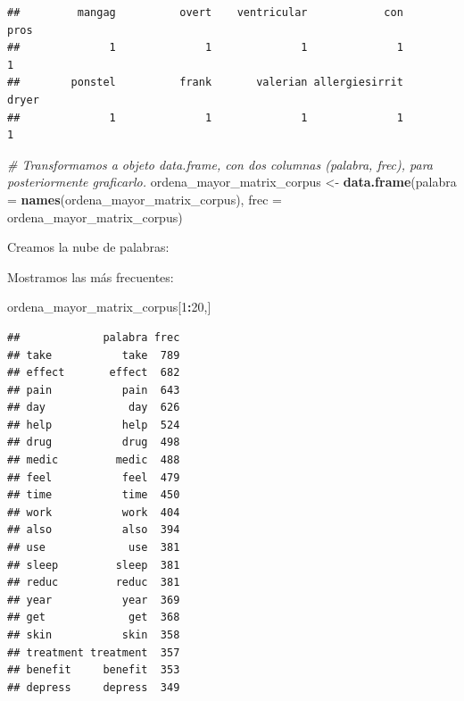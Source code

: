 \documentclass[spanish,]{article}
\newenvironment{Shaded}{\begin{snugshade}}{\end{snugshade}}
\newcommand{\KeywordTok}[1]{\textcolor[rgb]{0.13,0.29,0.53}{\textbf{#1}}}
\newcommand{\DataTypeTok}[1]{\textcolor[rgb]{0.13,0.29,0.53}{#1}}
\newcommand{\DecValTok}[1]{\textcolor[rgb]{0.00,0.00,0.81}{#1}}
\newcommand{\StringTok}[1]{\textcolor[rgb]{0.31,0.60,0.02}{#1}}
\newcommand{\CommentTok}[1]{\textcolor[rgb]{0.56,0.35,0.01}{\textit{#1}}}
\newcommand{\OperatorTok}[1]{\textcolor[rgb]{0.81,0.36,0.00}{\textbf{#1}}}
\newcommand{\NormalTok}[1]{#1}
\begin{document}
\begin{verbatim}
##         mangag          overt    ventricular            con           pros 
##              1              1              1              1              1 
##        ponstel          frank       valerian allergiesirrit          dryer 
##              1              1              1              1              1
\end{verbatim}

\begin{Shaded}
\begin{Highlighting}[]
\CommentTok{# Transformamos a objeto data.frame, con dos columnas (palabra, frec), para posteriormente graficarlo.}
\NormalTok{ordena_mayor_matrix_corpus <-}\StringTok{ }\KeywordTok{data.frame}\NormalTok{(}\DataTypeTok{palabra =} \KeywordTok{names}\NormalTok{(ordena_mayor_matrix_corpus), }\DataTypeTok{frec =}\NormalTok{ ordena_mayor_matrix_corpus)}
\end{Highlighting}
\end{Shaded}

Creamos la nube de palabras:

\begin{Shaded}
\end{Shaded}

Mostramos las más frecuentes:

\begin{Shaded}
\begin{Highlighting}[]
\NormalTok{ordena_mayor_matrix_corpus[}\DecValTok{1}\OperatorTok{:}\DecValTok{20}\NormalTok{,]}
\end{Highlighting}
\end{Shaded}

\begin{verbatim}
##             palabra frec
## take           take  789
## effect       effect  682
## pain           pain  643
## day             day  626
## help           help  524
## drug           drug  498
## medic         medic  488
## feel           feel  479
## time           time  450
## work           work  404
## also           also  394
## use             use  381
## sleep         sleep  381
## reduc         reduc  381
## year           year  369
## get             get  368
## skin           skin  358
## treatment treatment  357
## benefit     benefit  353
## depress     depress  349
\end{verbatim}
\end{document}
